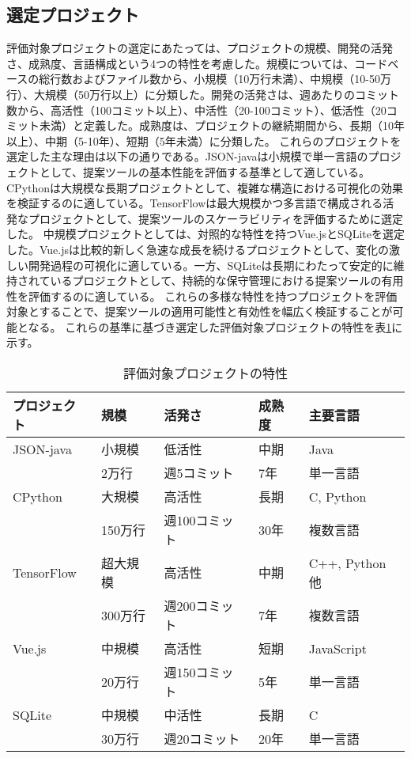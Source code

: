 \documentclass[12pt,twoside]{jbook}
\begin{document}
\subsection{選定プロジェクト}
評価対象プロジェクトの選定にあたっては、プロジェクトの規模、開発の活発さ、成熟度、言語構成という4つの特性を考慮した。規模については、コードベースの総行数およびファイル数から、小規模（10万行未満）、中規模（10-50万行）、大規模（50万行以上）に分類した。開発の活発さは、週あたりのコミット数から、高活性（100コミット以上）、中活性（20-100コミット）、低活性（20コミット未満）と定義した。成熟度は、プロジェクトの継続期間から、長期（10年以上）、中期（5-10年）、短期（5年未満）に分類した。
これらのプロジェクトを選定した主な理由は以下の通りである。JSON-javaは小規模で単一言語のプロジェクトとして、提案ツールの基本性能を評価する基準として適している。CPythonは大規模な長期プロジェクトとして、複雑な構造における可視化の効果を検証するのに適している。TensorFlowは最大規模かつ多言語で構成される活発なプロジェクトとして、提案ツールのスケーラビリティを評価するために選定した。
中規模プロジェクトとしては、対照的な特性を持つVue.jsとSQLiteを選定した。Vue.jsは比較的新しく急速な成長を続けるプロジェクトとして、変化の激しい開発過程の可視化に適している。一方、SQLiteは長期にわたって安定的に維持されているプロジェクトとして、持続的な保守管理における提案ツールの有用性を評価するのに適している。
これらの多様な特性を持つプロジェクトを評価対象とすることで、提案ツールの適用可能性と有効性を幅広く検証することが可能となる。
これらの基準に基づき選定した評価対象プロジェクトの特性を表\ref{tab:project-characteristics}に示す。

\begin{table}[htb]
\caption{評価対象プロジェクトの特性}
\label{tab:project-characteristics}
\begin{center}
\begin{tabular}{lllll}
\hline
プロジェクト & 規模 & 活発さ & 成熟度 & 主要言語 \\
\hline
JSON-java & 小規模 & 低活性 & 中期 & Java \\
 & 2万行 & 週5コミット & 7年 & 単一言語 \\
\hline
CPython & 大規模 & 高活性 & 長期 & C, Python \\
 & 150万行 & 週100コミット & 30年 & 複数言語 \\
\hline
TensorFlow & 超大規模 & 高活性 & 中期 & C++, Python他 \\
 & 300万行 & 週200コミット & 7年 & 複数言語 \\
\hline
Vue.js & 中規模 & 高活性 & 短期 & JavaScript \\
 & 20万行 & 週150コミット & 5年 & 単一言語 \\
\hline
SQLite & 中規模 & 中活性 & 長期 & C \\
 & 30万行 & 週20コミット & 20年 & 単一言語 \\
\hline
\end{tabular}
\end{center}
\end{table}
\end{document}
